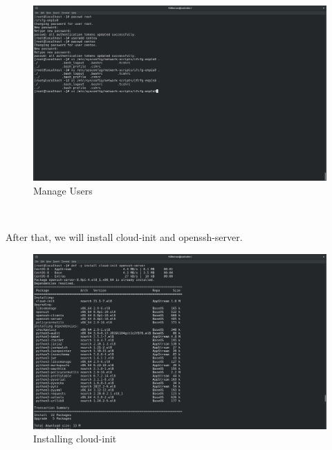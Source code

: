 \begin{spacing}{1.2}
\\
\begin{figure}[!htb] 
\begin{center} 
\includegraphics[width=1\linewidth]{Cloud/Add Virtual Machine Images/Add VM Images/Manage Users} 
\end{center} 
\caption{Manage Users} 
\end{figure}  \FloatBarrier
\\


\par After that, we will install cloud-init and openssh-server. 
\\
\begin{figure}[!htb] 
\begin{center} 
\includegraphics[width=1\linewidth]{Cloud/Add Virtual Machine Images/Add VM Images/Installing cloud-init} 
\end{center} 
\caption{Installing cloud-init} 
\end{figure}  \FloatBarrier
\\


\end{spacing}
